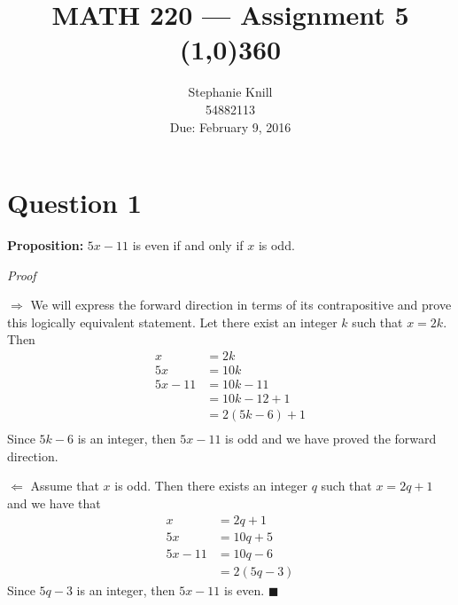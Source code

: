 \documentclass[11pt, oneside]{article}   	%
\newcommand*{\QEDA}{\hfill\ensuremath{\blacksquare}}         %
\begin{document}
\title{MATH 220 --- Assignment 5 \\
\line(1,0){360} \\              %
}
\author{
Stephanie Knill \\
54882113 \\
Due: February 9, 2016}

\date{}                   %
\maketitle




\section*{Question 1}

\textbf{Proposition:} $5x-11$ is even if and only if $x$ is odd.


\emph{Proof}

$\Rightarrow$ We will express the forward direction in terms of its contrapositive  and prove this logically equivalent statement. Let there exist an integer $k$ such that $x=2k$. Then
\begin{align*}
	x & =2k \\
	5x & = 10k \\
	5x -11 & = 10k - 11 \\
	& = 10k - 12 + 1 \\
	& = 2(5k-6) + 1 \\
\end{align*}
Since $5k-6$ is an integer, then $5x-11$ is odd and we have proved the forward direction.

$\Leftarrow$ Assume that $x$ is odd. Then there exists an integer $q$ such that $x=2q+1$ and we have that
\begin{align*}
	x & =2q+1 \\
	5x & = 10q + 5 \\
	5x -11 & = 10q -6 \\
	& = 2(5q-3)
\end{align*}
Since $5q-3$ is an integer, then $5x-11$ is even. \QEDA
\end{document}
